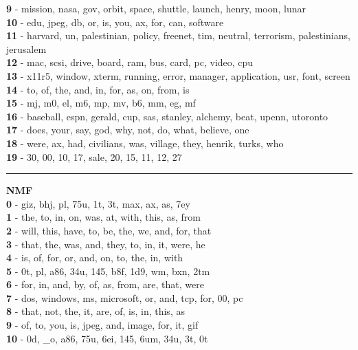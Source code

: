\textbf{9} - mission, nasa, gov, orbit, space, shuttle, launch, henry, moon, lunar\\
\textbf{10} - edu, jpeg, db, or, is, you, ax, for, can, software\\
\textbf{11} - harvard, un, palestinian, policy, freenet, tim, neutral, terrorism, palestinians, jerusalem\\
\textbf{12} - mac, scsi, drive, board, ram, bus, card, pc, video, cpu\\
\textbf{13} - x11r5, window, xterm, running, error, manager, application, usr, font, screen\\
\textbf{14} - to, of, the, and, in, for, as, on, from, is\\
\textbf{15} - mj, m0, el, m6, mp, mv, b6, mm, eg, mf\\
\textbf{16} - baseball, espn, gerald, cup, sas, stanley, alchemy, beat, upenn, utoronto\\
\textbf{17} - does, your, say, god, why, not, do, what, believe, one\\
\textbf{18} - were, ax, had, civilians, was, village, they, henrik, turks, who\\
\textbf{19} - 30, 00, 10, 17, sale, 20, 15, 11, 12, 27\\
\hrule\vspace{2mm}
\noindent
\textbf{NMF}\vspace{2mm}\\
\vspace{2mm}
\noindent
\textbf{0} - giz, bhj, pl, 75u, 1t, 3t, max, ax, as, 7ey\\
\textbf{1} - the, to, in, on, was, at, with, this, as, from\\
\textbf{2} - will, this, have, to, be, the, we, and, for, that\\
\textbf{3} - that, the, was, and, they, to, in, it, were, he\\
\textbf{4} - is, of, for, or, and, on, to, the, in, with\\
\textbf{5} - 0t, pl, a86, 34u, 145, b8f, 1d9, wm, bxn, 2tm\\
\textbf{6} - for, in, and, by, of, as, from, are, that, were\\
\textbf{7} - dos, windows, ms, microsoft, or, and, tcp, for, 00, pc\\
\textbf{8} - that, not, the, it, are, of, is, in, this, as\\
\textbf{9} - of, to, you, is, jpeg, and, image, for, it, gif\\
\textbf{10} - 0d, \_o, a86, 75u, 6ei, 145, 6um, 34u, 3t, 0t\\

